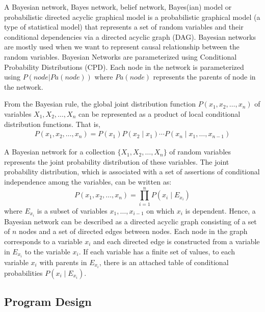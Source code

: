 \documentclass{gapd}
\begin{document}
A Bayesian network, Bayes network, belief network, Bayes(ian) model or
probabilistic directed acyclic graphical model is a probabilistic
graphical model (a type of statistical model) that represents a set of
random variables and their conditional dependencies via a directed
acyclic graph (DAG). Bayesian networks are mostly used when we want to
represent causal relationship between the random variables. Bayesian
Networks are parameterized using Conditional Probability Distributions
(CPD). Each node in the network is parameterized using $ P(node | Pa(node)) $ where $Pa(node) $ represents the parents of node in the network.

From the Bayesian rule, the global joint distribution function 
$P\left(x_{1}, x_{2}, \ldots, x_{n}\right)$ of variables $X_{1}, X_{2}, \ldots, X_{n}$ 
can be represented as a product of local conditional distribution functions. That is,
\begin{equation*}
  \begin{aligned}
  P\left(x_{1}, x_{2}, \ldots, x_{n}\right) =  P\left(x_{1}\right) P\left(x_{2} \mid x_{1}\right) \cdots 
  P\left(x_{n} \mid x_{1}, \ldots, x_{n-1}\right) 
  \end{aligned}  
\end{equation*}

A Bayesian network for a collection $\{X_{1}, X_{2}, \ldots, X_{n}\}$ of random variables
represents the joint probability distribution of these variables.
The joint probability distribution, which is associated with a set of assertions of conditional independence among the variables, can be written as:
$$
P\left(x_{1}, x_{2}, \ldots, x_{n}\right)=\prod_{i=1}^{n} P\left(x_{i} \mid E_{x_{i}}\right)
$$
where $E_{x_{i}}$ is a subset of variables $x_{1}, \ldots, x_{i-1}$
on which $x_{i}$ is dependent.
Hence, a Bayesian network can be described as a directed acyclic
graph consisting of a set of $n$ nodes and a set of
directed edges between nodes. 
Each node in the graph corresponds to a variable $x_{i}$ and 
each directed edge is constructed from a variable 
in $E_{x_{i}}$ to the variable $x_{i} .$ 
If each variable has a finite set of values, to each variable
$x_{i}$ with parents in $E_{x_{i}}$, 
there is an attached table of conditional probabilities 
$P\left(x_{i} \mid E_{x_{i}}\right) .$

\subsection{Program Design}\label{program-design}
\end{document}
